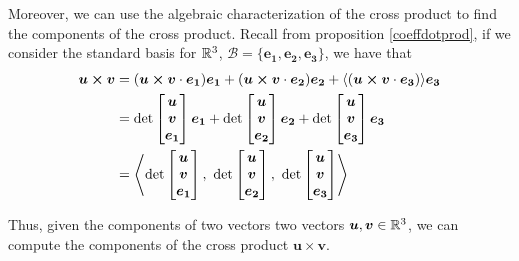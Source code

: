 Moreover, we can use the algebraic characterization of the cross product to find the components of the cross product.  Recall from proposition \ref{coeffdotprod}, if we consider the standard basis for $\mathbb{R}^3$, $\mathscr{B} = \{ \bm{e_1}, \bm{e_2},\bm{e_3}\}$, we have that 
\begin{align*}
        \bm{u \times v} &=  (\bm{u \times v}\cdot \bm{e_1}) \bm{e_1} + (\bm{u \times v}\cdot \bm{e_2}) \bm{e_2} + \langle(\bm{u \times v}\cdot \bm{e_3}) \rangle \bm{e_3} \\
        &= \textnormal{det}
\begin{bmatrix}
\bm{u}\\
    \bm{v}  \\
    \bm{e_1}
\end{bmatrix}\bm{e_1} + \textnormal{det}
\begin{bmatrix}
\bm{u}\\
    \bm{v}  \\
    \bm{e_2}
\end{bmatrix}\bm{e_2} + \textnormal{det}
\begin{bmatrix}
\bm{u}\\
    \bm{v}  \\
    \bm{e_3}
\end{bmatrix}\bm{e_3} \\
    &= 
    \left\langle\textnormal{det}
\begin{bmatrix}
\bm{u}\\
    \bm{v}  \\
    \bm{e_1}
\end{bmatrix}, \  \textnormal{det}
\begin{bmatrix}
\bm{u}\\
    \bm{v}  \\
    \bm{e_2}
\end{bmatrix}, \ \textnormal{det}
\begin{bmatrix}
\bm{u}\\
    \bm{v}  \\
    \bm{e_3}
\end{bmatrix} \right\rangle
    \end{align*}

Thus, given the components of two vectors two vectors $\bm{u}, \bm{v} \in \mathbb{R}^3$, we can compute the components of the cross product $\bm{u \times v}$.

